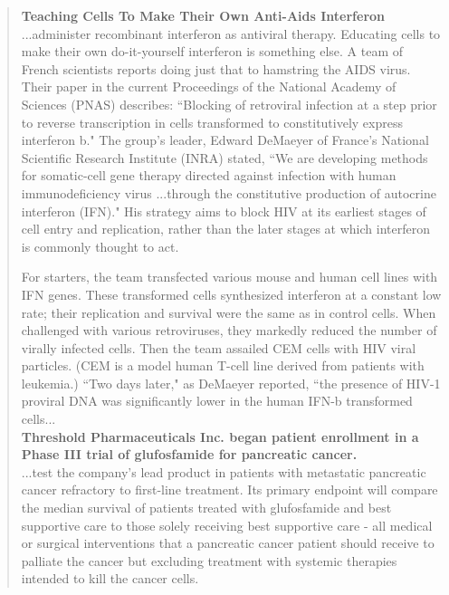 \begin{singlespace}
\begin{small}
\begin{quotation}
\noindent \textbf{Teaching Cells To Make Their Own Anti-Aids Interferon} \\

...administer recombinant interferon as antiviral therapy. Educating cells to make their own do-it-yourself interferon is something else. A team of French scientists reports doing just that to hamstring the AIDS virus. Their paper in the current Proceedings of the National Academy of Sciences (PNAS) describes: ``Blocking of retroviral infection at a step prior to reverse transcription in cells transformed to constitutively express interferon b." The group's leader, Edward DeMaeyer of France's National Scientific Research Institute (INRA) stated, ``We are developing methods for somatic-cell gene therapy directed against infection with human immunodeficiency virus ...through the constitutive production of autocrine interferon (IFN)." His strategy aims to block HIV at its earliest stages of cell entry and replication, rather than the later stages at which interferon is commonly thought to act.

For starters, the team transfected various mouse and human cell lines with IFN genes. These transformed cells synthesized interferon at a constant low rate; their replication and survival were the same as in control cells. When challenged with various retroviruses, they markedly reduced the number of virally infected cells. Then the team assailed CEM cells with HIV viral particles. (CEM is a model human T-cell line derived from patients with leukemia.) ``Two days later," as DeMaeyer reported, ``the presence of HIV-1 proviral DNA was significantly lower in the human IFN-b transformed cells...\\

\noindent \textbf{Threshold Pharmaceuticals Inc. began patient enrollment in a Phase III trial of glufosfamide for pancreatic cancer.} \\

...test the company's lead product in patients with metastatic pancreatic cancer refractory to first-line treatment. Its primary endpoint will compare the median survival of patients treated with glufosfamide and best supportive care to those solely receiving best supportive care - all medical or surgical interventions that a pancreatic cancer patient should receive to palliate the cancer but excluding treatment with systemic therapies intended to kill the cancer cells.


\end{quotation}
\end{small}
\end{singlespace}
